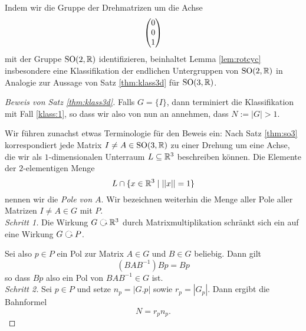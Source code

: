 \documentclass{book}
\begin{document}
\begin{rem}
    \label{rem:klass2d}
    Indem wir die Gruppe der Drehmatrizen um die Achse
    \[
        \begin{pmatrix}  0 \\ 0 \\ 1  \end{pmatrix}
    \]
    mit der Gruppe $\operatorname{SO}(2, \mathbb{R})$ identifizieren, beinhaltet Lemma \ref{lem:rotcyc}
    insbesondere eine Klassifikation der endlichen Untergruppen von
    $\operatorname{SO}(2,\mathbb{R})$ in Analogie zur Aussage von Satz \ref{thm:klass3d} für
    $\operatorname{SO}(3,\mathbb{R})$.
\end{rem}

\begin{proof}[Beweis von Satz \ref{thm:klass3d}]
    Falls $G = \{I\}$, dann terminiert die Klassifikation mit Fall
    \ref{klass:1}, so dass wir also von nun an annehmen, dass $N := |G| > 1$.

    Wir führen zunachst etwas Terminologie für den Beweis ein: Nach Satz
    \ref{thm:so3} korrespondiert jede Matrix $I \neq A \in \operatorname{SO}(3,\mathbb{R})$ zu einer
    Drehung um eine Achse, die wir als $1$-dimensionalen Unterraum $L \subseteq
    \mathbb{R}^3$ beschreiben können. Die Elemente der $2$-elementigen Menge 
    \[
        L \cap \{ x \in \mathbb{R}^3 \; | \; ||x|| = 1\}
    \]
    nennen wir die {\em Pole von $A$}. Wir bezeichnen weiterhin die Menge aller
    Pole aller Matrizen $I \neq A \in G$ mit $P$.\\

    \noindent
    \emph{Schritt 1.} Die Wirkung $G \actson \RR^3$ durch Matrixmultiplikation
    schränkt sich ein auf eine Wirkung $G \actson P$. 

    Sei also $p \in P$ ein Pol zur Matrix $A \in G$ und $B \in G$ beliebig. Dann gilt
    \[
        (BAB^{-1})Bp = Bp
    \]
    so dass $Bp$ also ein Pol von $BAB^{-1} \in G$ ist.\\

    \noindent
    \emph{Schritt 2.} Sei $p \in P$ und setze $n_p = |G.p|$ sowie $r_p = |G_p|$.
    Dann ergibt die Bahnformel
    \begin{equation}
        \label{eq:bahnso3}
        N = r_p  n_p.
    \end{equation}


\end{proof}
\end{document}
